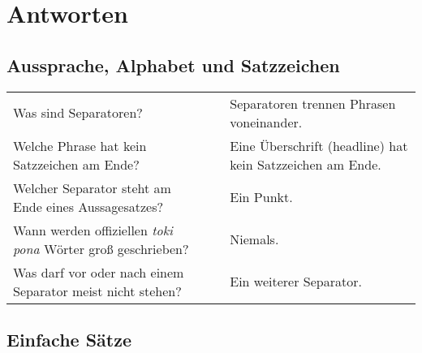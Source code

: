 \section{Antworten}

\subsection*{Aussprache, Alphabet und Satzzeichen} 
\label{'pronunciation_alphabet'}

\begin{supertabular}{p{5,5cm}|ll}
Was sind Separatoren? && Separatoren trennen Phrasen voneinander.  \\ %
Welche Phrase hat kein Satzzeichen am Ende? && Eine Überschrift (headline) hat kein Satzzeichen am Ende. \\ %
Welcher Separator steht am Ende eines Aussagesatzes? && Ein Punkt. \\ %
Wann werden offiziellen \textit{toki pona} Wörter groß geschrieben? && Niemals. \\ %
Was darf vor oder nach einem Separator meist nicht stehen? && Ein weiterer Separator. \\ %
\end{supertabular} 

\newpage
%
\subsection*{Einfache Sätze} 
\label{'basic_sentences'}

